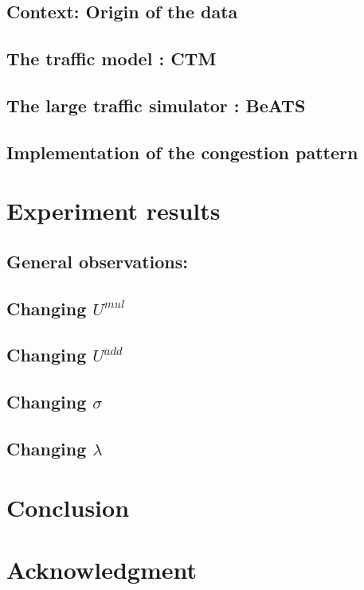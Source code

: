 \subsection{Context: Origin of the data}
\label{subsec:pems}

\subsection{The traffic model : CTM}
\label{ctm}

\subsection{The large traffic simulator : BeATS}
\label{subsec:beats}

\subsection{Implementation of the congestion pattern}
\label{subsec:cpimplementation}







\section{Experiment results}
\subsection{General observations:}
\label{subsec:results_intro}

\subsection{Changing $U^{mul}$}
\label{umul}

\subsection{Changing $U^{add}$}
\label{subsec:uadd}

\subsection{Changing $\sigma$}
\label{subsec:sigma}

\subsection{Changing $\lambda$}
\label{subsec:lambda}


\section{Conclusion}


\section*{Acknowledgment}



\label{sec:appendix}






%

